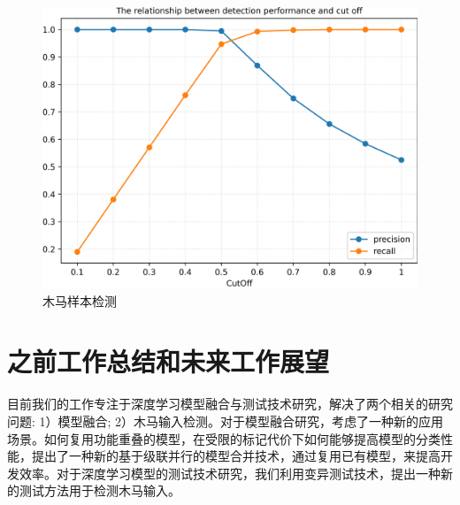 \documentclass[fontset=macnew,UTF8]{article} %
\begin{document}
\begin{figure}[t]
{\begin{minipage}[b]{.3\linewidth}
			\includegraphics[scale=0.28]{./Backdoor_detect_result/detect/WaNet.png}
		\end{minipage}
	}
	
	\caption{木马样本检测}
	\label{detect}
\end{figure}


\section{之前工作总结和未来工作展望}

目前我们的工作专注于深度学习模型融合与测试技术研究，解决了两个相关的研究问题: 1）模型融合; 2）木马输入检测。对于模型融合研究，考虑了一种新的应用场景。如何复用功能重叠的模型，在受限的标记代价下如何能够提高模型的分类性能，提出了一种新的基于级联并行的模型合并技术，通过复用已有模型，来提高开发效率。对于深度学习模型的测试技术研究，我们利用变异测试技术，提出一种新的测试方法用于检测木马输入。
\end{document}
